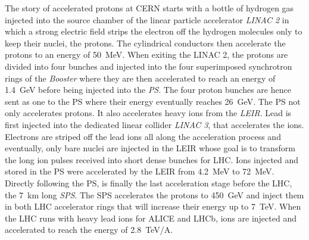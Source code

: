 	The story of accelerated protons at CERN starts with a bottle of hydrogen gas injected into the source chamber of the linear particle accelerator \textit{LINAC 2} in which a strong electric field strips the electron off the hydrogen molecules only to keep their nuclei, the protons. The cylindrical conductors then accelerate the protons to an energy of \SI{50}{MeV}.
	When exiting the LINAC 2, the protons are divided into four bunches and injected into the four superimposed synchrotron rings of the \textit{Booster} where they are then accelerated to reach an energy of \SI{1.4}{GeV} before being injected into the \textit{PS}.
	The four proton bunches are hence sent as one to the PS where their energy eventually reaches \SI{26}{GeV}. The PS not only accelerates protons. It also accelerates heavy ions from the \textit{\acf{LEIR}}. Lead is first injected into the dedicated linear collider \textit{LINAC 3}, that accelerates the ions. Electrons are striped off the lead ions all along the acceleration process and eventually, only bare nuclei are injected in the LEIR whose goal is to transform the long ion pulses received into short dense bunches for LHC. Ions injected and stored in the PS were accelerated by the LEIR from \SI{4.2}{MeV} to \SI{72}{MeV}.
	Directly following the PS, is finally the last acceleration stage before the LHC, the \SI{7}{km} long \textit{SPS}. The SPS accelerates the protons to \SI{450}{GeV} and inject them in both LHC accelerator rings that will increase their energy up to \SI{7}{TeV}. When the LHC runs with heavy lead ions for ALICE and LHCb, ions are injected and accelerated to reach the energy of \SI{2.8}{TeV/A}.
	
